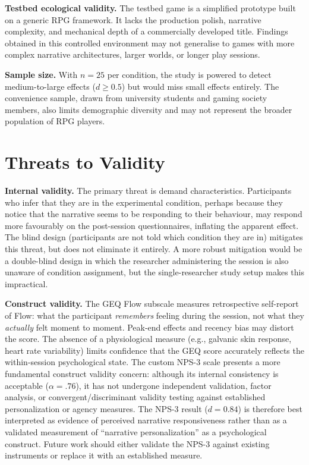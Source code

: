 \textbf{Testbed ecological validity.} The testbed game is a simplified prototype built on a generic RPG framework. It lacks the production polish, narrative complexity, and mechanical depth of a commercially developed title. Findings obtained in this controlled environment may not generalise to games with more complex narrative architectures, larger worlds, or longer play sessions.

\textbf{Sample size.} With $n = 25$ per condition, the study is powered to detect medium-to-large effects ($d \geq 0.5$) but would miss small effects entirely. The convenience sample, drawn from university students and gaming society members, also limits demographic diversity and may not represent the broader population of RPG players.

\section{Threats to Validity}

\textbf{Internal validity.} The primary threat is demand characteristics. Participants who infer that they are in the experimental condition, perhaps because they notice that the narrative seems to be responding to their behaviour, may respond more favourably on the post-session questionnaires, inflating the apparent effect. The blind design (participants are not told which condition they are in) mitigates this threat, but does not eliminate it entirely. A more robust mitigation would be a double-blind design in which the researcher administering the session is also unaware of condition assignment, but the single-researcher study setup makes this impractical.

\textbf{Construct validity.} The GEQ Flow subscale measures retrospective self-report of Flow: what the participant \textit{remembers} feeling during the session, not what they \textit{actually} felt moment to moment. Peak-end effects and recency bias may distort the score. The absence of a physiological measure (e.g., galvanic skin response, heart rate variability) limits confidence that the GEQ score accurately reflects the within-session psychological state. The custom NPS-3 scale presents a more fundamental construct validity concern: although its internal consistency is acceptable ($\alpha = .76$), it has not undergone independent validation, factor analysis, or convergent/discriminant validity testing against established personalization or agency measures. The NPS-3 result ($d = 0.84$) is therefore best interpreted as evidence of perceived narrative responsiveness rather than as a validated measurement of ``narrative personalization'' as a psychological construct. Future work should either validate the NPS-3 against existing instruments or replace it with an established measure.

